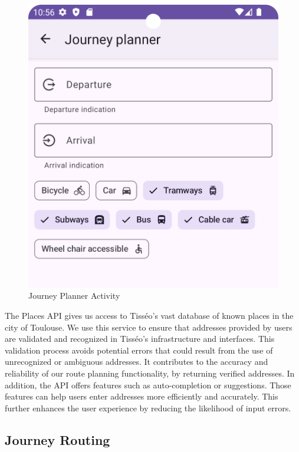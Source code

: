 \begin{figure}[h]
    \centering
    \includegraphics[scale=0.20]{img/journey.png}
    \caption{Journey Planner Activity}
    \label{fig:JourneyPlanner}
\end{figure}


The Places API gives us access to Tisséo's vast database of known places in the city of Toulouse. We use this service to ensure that addresses provided by users are validated and recognized in Tisséo's infrastructure and interfaces. This validation process avoids potential errors that could result from the use of unrecognized or ambiguous addresses. It contributes to the accuracy and reliability of our route planning functionality, by returning verified addresses. In addition, the API offers features such as auto-completion or suggestions. Those features can help users enter addresses more efficiently and accurately. This further enhances the user experience by reducing the likelihood of input errors.


\subsection{Journey Routing}


